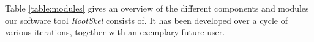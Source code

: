 %


Table \ref{table:modules} gives an overview of the different components and modules our software tool \textit{RootSkel} consists of. It has been developed over a cycle of various iterations, together with an exemplary future user. 






